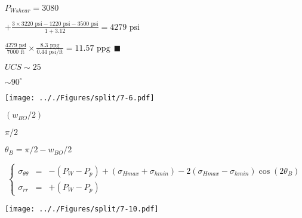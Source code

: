 \documentclass[onecolumn,11pt]{report}
\def\lthtmlcheckvsize{\ifdim\ht\sizebox<\vsize 
  \ifdim\wd\sizebox<\hsize\expandafter\hfill\fi \expandafter\vfill
  \else\expandafter\vss\fi}%
\begin{document}
{\newpage\clearpage
{}%
$\displaystyle P_{Wshear} = 3080$%
\lthtmlindisplaymathZ
\lthtmlcheckvsize\clearpage}

{\newpage\clearpage
{}%
$\displaystyle + \frac{3 \times 3220 \text{ psi} - 1220 \text{ psi} - 3500 \text{ psi} }{1+3.12} =
		4279 \text{ psi}  
$%
\lthtmlindisplaymathZ
\lthtmlcheckvsize\clearpage}

{\newpage\clearpage
{}%
$\displaystyle \frac{4279 \text{ psi}} {7000 \text{ ft}} \times
\frac{8.3 \text{ ppg}} {0.44 \text{ psi/ft}} =
11.57 \text{ ppg} \: \: \blacksquare
$%
\lthtmlindisplaymathZ
\lthtmlcheckvsize\clearpage}

{\newpage\clearpage
{}%
$ UCS \sim 25$%
\lthtmlindisplaymathZ
\lthtmlcheckvsize\clearpage}

{\newpage\clearpage
{}%
$ \sim 90^{\circ}$%
\lthtmlindisplaymathZ
\lthtmlcheckvsize\clearpage}

{\newpage\clearpage
{}%
\texttt{[image: .././Figures/split/7-6.pdf]}%
\lthtmlpictureZ
\lthtmlcheckvsize\clearpage}

{\newpage\clearpage
{}%
$ (w_{BO}/2)$%
\lthtmlindisplaymathZ
\lthtmlcheckvsize\clearpage}

{\newpage\clearpage
{}%
$ \pi/2$%
\lthtmlindisplaymathZ
\lthtmlcheckvsize\clearpage}

{\newpage\clearpage
{}%
$ \theta_B = \pi/2 - w_{BO}/2$%
\lthtmlindisplaymathZ
\lthtmlcheckvsize\clearpage}

{\newpage\clearpage
{}%
\begin{displaymath}\left\lbrace
\begin{array}{rcl}
\sigma_{\theta \theta} & = &
-(P_W - P_p) + (\sigma_{Hmax} + \sigma_{hmin})
- 2(\sigma_{Hmax} - \sigma_{hmin})
\cos (2 \theta_B)  \\
\sigma_{rr} & = &  +(P_W - P_p)
\end{array}
\right.\end{displaymath}%
\lthtmldisplayZ
\lthtmlcheckvsize\clearpage}

{\newpage\clearpage
{}%
\texttt{[image: .././Figures/split/7-10.pdf]}%
\lthtmlpictureZ
\lthtmlcheckvsize\clearpage}
\end{document}
